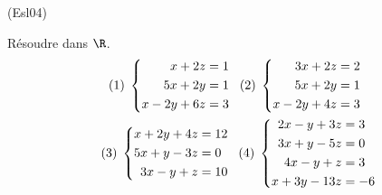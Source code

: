 \begin{tiny}(Esl04)\end{tiny} Résoudre dans $\R$.
\begin{multline*}
 (1)\;\left\lbrace 
\begin{aligned}
 x  + 2z &= 1 \\
 5x + 2y  &= 1\\
 x - 2y + 6z &= 3
\end{aligned}
\right. 
\hspace{0.2cm} (2)\;\left\lbrace 
\begin{aligned}
 3x  + 2z &= 2 \\
 5x + 2y  &= 1\\
 x - 2y + 4z &= 3
\end{aligned}
\right. \\
\hspace{0.2cm} (3)\;\left\lbrace 
\begin{aligned}
 x  + 2y + 4z &= 12 \\
 5x + y  - 3z &= 0\\
 3x - y + z &= 10
\end{aligned}
\right. 
\hspace{0.2cm} (4)\;\left\lbrace 
\begin{aligned}
 2x  - y + 3z &= 3 \\
 3x + y  - 5z &= 0\\
 4x - y + z &= 3 \\
 x + 3y -13z &= -6
\end{aligned}
\right. 
\end{multline*}
